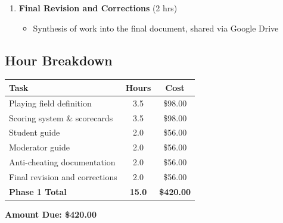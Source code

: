 \documentclass[a4]{article}
\begin{document}
\begin{enumerate}[leftmargin=*]
    \item \textbf{Final Revision and Corrections} (2 hrs)
    \begin{itemize}
        \item Synthesis of work into the final document, shared via Google Drive
    \end{itemize}
\end{enumerate}

\subsection*{Hour Breakdown}

\begin{center}
\begin{tabular}{lcc}
\toprule
\textbf{Task} & \textbf{Hours} & \textbf{Cost} \\
\midrule
Playing field definition & 3.5 & \$98.00 \\
Scoring system \& scorecards & 3.5 & \$98.00 \\
Student guide & 2.0 & \$56.00 \\
Moderator guide & 2.0 & \$56.00 \\
Anti-cheating documentation & 2.0 & \$56.00 \\
Final revision and corrections & 2.0 & \$56.00 \\
\midrule
\textbf{Phase 1 Total} & \textbf{15.0} & \textbf{\$420.00} \\
\bottomrule
\end{tabular}
\end{center}

\vspace{1.5em}

\begin{center}
\large\textbf{Amount Due: \$420.00}
\end{center}

\vspace{1.5em}

\noindent{}
\end{document}
